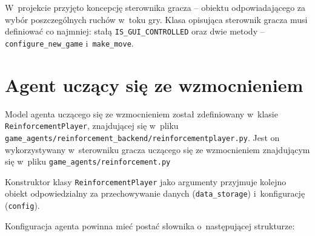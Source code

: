 \documentclass[a4paper, 12pt, oneside]{report}
\begin{document}
 W~projekcie przyjęto koncepcję sterownika gracza -- obiektu odpowiadającego za wybór poszczególnych ruchów w~toku gry. Klasa opisująca sterownik gracza musi definiować co najmniej: stałą \texttt{IS\_GUI\_CONTROLLED} oraz dwie metody -- \texttt{configure\_new\_game} i~\texttt{make\_move}.

\needspace{5em}



\section{Agent uczący się ze wzmocnieniem}
\label{sec:impl_agenta}

\begin{sloppypar}
Model agenta uczącego się ze wzmocnieniem został zdefiniowany w~klasie \texttt{ReinforcementPlayer}, znajdującej się w~pliku \texttt{game\_agents/reinforcement\_backend/reinforcementplayer.py}. Jest on wykorzystywany w~sterowniku gracza uczącego się ze wzmocnieniem znajdującym się w~pliku \texttt{game\_agents/reinforcement.py}
\end{sloppypar}

Konstruktor klasy \texttt{ReinforcementPlayer} jako argumenty przyjmuje kolejno obiekt odpowiedzialny za przechowywanie danych (\texttt{data\_storage}) i~konfigurację (\texttt{config}).

Konfiguracja agenta powinna mieć postać słownika o~następującej strukturze:

\needspace{5em}


\end{document}
